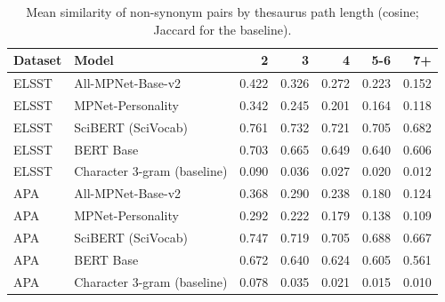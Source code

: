 \begin{table}[ht]
\centering
\small
\caption{Mean similarity of non-synonym pairs by thesaurus path length (cosine; Jaccard for the baseline).}
\label{tab:S10_similarity_by_path_length}
\begin{tabular}{llrrrrr}
\toprule
Dataset & Model & 2 & 3 & 4 & 5-6 & 7+ \\
\midrule
ELSST & All-MPNet-Base-v2 & 0.422 & 0.326 & 0.272 & 0.223 & 0.152 \\
ELSST & MPNet-Personality & 0.342 & 0.245 & 0.201 & 0.164 & 0.118 \\
ELSST & SciBERT (SciVocab) & 0.761 & 0.732 & 0.721 & 0.705 & 0.682 \\
ELSST & BERT Base & 0.703 & 0.665 & 0.649 & 0.640 & 0.606 \\
ELSST & Character 3-gram (baseline) & 0.090 & 0.036 & 0.027 & 0.020 & 0.012 \\
APA & All-MPNet-Base-v2 & 0.368 & 0.290 & 0.238 & 0.180 & 0.124 \\
APA & MPNet-Personality & 0.292 & 0.222 & 0.179 & 0.138 & 0.109 \\
APA & SciBERT (SciVocab) & 0.747 & 0.719 & 0.705 & 0.688 & 0.667 \\
APA & BERT Base & 0.672 & 0.640 & 0.624 & 0.605 & 0.561 \\
APA & Character 3-gram (baseline) & 0.078 & 0.035 & 0.021 & 0.015 & 0.010 \\
\bottomrule
\end{tabular}
\end{table}

